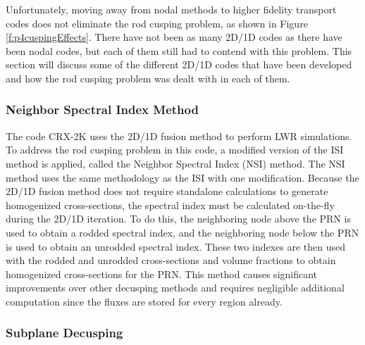 Unfortunately, moving away from nodal methods to higher fidelity transport codes does not eliminate the rod cusping problem, as shown in Figure \ref{f:p4cuspingEffects}.  There have not been as many 2D/1D codes as there have been nodal codes, but each of them still had to contend with this problem.  This section will discuss some of the different 2D/1D codes that have been developed and how the rod cusping problem was dealt with in each of them.

\subsubsection{Neighbor Spectral Index Method}

The code CRX-2K \cite{cho2015CRX2d1dFusionDecusping} uses the 2D/1D fusion method to perform LWR simulations.  To address the rod cusping problem in this code, a modified version of the ISI method is applied, called the Neighbor Spectral Index (NSI) method.  The NSI method uses the same methodology as the ISI with one modification.  Because the 2D/1D fusion method does not require standalone calculations to generate homogenized cross-sections, the spectral index must be calculated on-the-fly during the 2D/1D iteration.  To do this, the neighboring node above the PRN is used to obtain a rodded spectral index, and the neighboring node below the PRN is used to obtain an unrodded spectral index.  These two indexes are then used with the rodded and unrodded cross-sections and volume fractions to obtain homogenized cross-sections for the PRN.  This method causes significant improvements over other decusping methods and requires negligible additional computation since the fluxes are stored for every region already.

\subsubsection{Subplane Decusping}\label{sss:ntracerDecusping}

